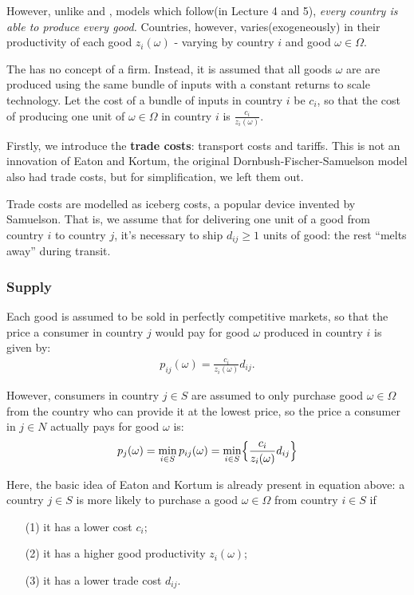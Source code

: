 However, unlike \cite{krugman1980scale} and \cite{melitz2003impact}, models which follow(in Lecture 4 and 5),
\textit{every country is able to produce every good.}
Countries, however, varies(exogeneously) in their productivity of each good $z_i(\omega)$ - varying by country $i$ and good $\omega \in \Omega$.

The \cite{eaton2002technology} has no concept of a firm. Instead, it is assumed that all
goods $\omega$ are are produced using the same bundle of inputs with a constant returns to
scale technology. Let the cost of a bundle of inputs in country $i$ be $c_i$,
so that the cost of producing one unit of $\omega \in \Omega$ in country $i$ is $\frac{c_i}{z_i(\omega)}$.

Firstly, we introduce the \textbf{trade costs}: transport costs and tariffs. This is not an innovation of Eaton
and Kortum, the original Dornbush-Fischer-Samuelson model also had trade costs, but for simplification, we left them out.
    
Trade costs are modelled as iceberg costs, a popular device invented by Samuelson\cite{samuelson1954transfer}.
That is, we assume that for delivering one unit of a good from country $i$ to country $j$, 
it's necessary to ship $d_{ij} \geq 1$ units of good: the rest “melts away” during transit. 

\subsubsection{Supply}

Each good is assumed to be sold in perfectly competitive markets, so that the price a
consumer in country $j$ would pay for good $\omega$ produced in country $i$ is given by:
\begin{gather*}
    p_{ij}(\omega) = \frac{c_i}{z_i(\omega)} d_{ij}. \label{eq:EKprice}
\end{gather*}

However, consumers in country $j \in S$ are assumed to only purchase good $\omega \in \Omega$
from the country who can provide it at the lowest price, so the price a consumer in
$j \in N$ actually pays for good $\omega$ is:
\begin{gather*}
    p_j(\omega) = \min_{i \in S} p_{ij}(\omega) = \min _{i \in S} \Bigl\{ \frac{c_i}{z_i(\omega)} d_{ij} \Bigr\} \label{eq:EKprice2}
\end{gather*}

Here, the basic idea of Eaton and Kortum is already present in equation above:
a country $j \in S$ is more likely to purchase a good $\omega \in \Omega$ from country $i \in S$ if
\begin{enumerate}
    \item[(1)] it has a lower cost $c_i$;
    \item[(2)] it has a higher good productivity $z_i(\omega)$;
    \item[(3)] it has a lower trade cost $d_{ij}$. 
\end{enumerate}

